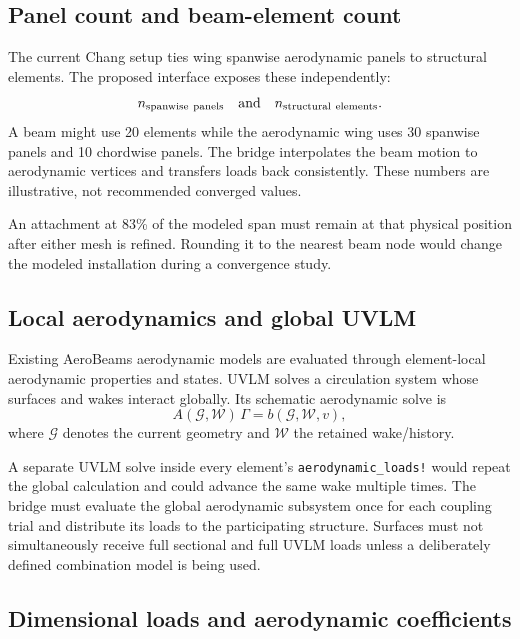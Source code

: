 \documentclass[11pt,a4paper]{article}
\newcommand{\code}{\nolinkurl}
\begin{document}
\subsection{Panel count and beam-element count}

The current Chang setup ties wing spanwise aerodynamic panels to structural
elements. The proposed interface exposes these independently:
\begin{equation}
 n_{\mathrm{spanwise\ panels}}\quad\hbox{and}\quad
 n_{\mathrm{structural\ elements}}.
\end{equation}
A beam might use 20 elements while the aerodynamic wing uses 30 spanwise
panels and 10 chordwise panels. The bridge interpolates the beam motion to
aerodynamic vertices and transfers loads back consistently. These numbers
are illustrative, not recommended converged values.

An attachment at 83\% of the modeled span must remain at that physical
position after either mesh is refined. Rounding it to the nearest beam node
would change the modeled installation during a convergence study.

\subsection{Local aerodynamics and global UVLM}

Existing AeroBeams aerodynamic models are evaluated through element-local
aerodynamic properties and states. UVLM solves a circulation system whose
surfaces and wakes interact globally. Its schematic aerodynamic solve is
\begin{equation}
 A(\mathcal{G},\mathcal{W})\,\Gamma=b(\mathcal{G},\mathcal{W},v),
\end{equation}
where $\mathcal{G}$ denotes the current geometry and $\mathcal{W}$ the
retained wake/history.

A separate UVLM solve inside every element's \code{aerodynamic_loads!}
would repeat the global calculation and could advance the same wake multiple
times. The bridge must evaluate the global aerodynamic subsystem once for
each coupling trial and distribute its loads to the participating structure.
Surfaces must not simultaneously receive full sectional and full UVLM loads
unless a deliberately defined combination model is being used.

\subsection{Dimensional loads and aerodynamic coefficients}
\end{document}
